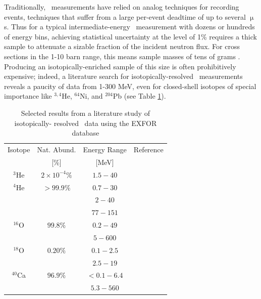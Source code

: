 \begin{eqation}
Traditionally, \tot\ measurements have relied on analog techniques for recording
events, techniques that suffer from a large per-event deadtime of
up to several $\upmu$s. Thus for a typical intermediate-energy \tot\ measurement
with dozens or hundreds of energy bins, achieving statistical uncertainty at the
level of 1\% requires a thick sample to attenuate a sizable fraction of the
incident neutron flux. For cross sections in the 1-10 barn range, this means
sample masses of tens of grams \cite{Finlay1993, Abfalterer2001}.
Producing an isotopically-enriched sample of this size is often
prohibitively expensive; indeed, a literature search for isotopically-resolved
\tot\ measurements reveals a paucity of data from 1-300 MeV, even for
closed-shell isotopes of special importance like $^{3,4}$He, $^{64}$Ni, and
$^{204}$Pb (see Table \ref{IsotopicCrossSectionTable}).

\begin{table}[ht]
    \caption{Selected results from a literature study of isotopically-
        resolved \tot\ data using the EXFOR database \cite{EXFORDatabase}}
    \label{IsotopicCrossSectionTable}
    \begin{center}
        \begin{tabular}{ c c c c }
            \hline
            Isotope & Nat. Abund. & Energy Range & Reference\\
                    & [\%] & [MeV] & \\

            \hline

            $^{3}$He & $2\times 10^{-4}\%$ & $1.5 - 40$ & \cite{Haesner1983}\\
            $^{4}$He & $>99.9\%$ & $0.7-30$ & \cite{Goulding1973}\\
            & & $2-40$ & \cite{Haesner1983}\\
            & & $77-151$ & \cite{Measday1966}\\

            $^{16}$O & $99.8\%$ & $0.2-49$ & \cite{Perey1972}\\
            & & $5-600$ & \cite{Finlay1993}\\

            $^{18}$O & $0.20\%$ & $0.1-2.5$ & \cite{Vaughn1965}\\
            & & $2.5-19$ & \cite{Salisbury1965}\\

            $^{40}$Ca & $96.9\%$ & $<0.1-6.4$ & \cite{Johnson1973}\\
            & & $5.3-560$ & \cite{Abfalterer2001}\\


\end{tabular}
\end{center}
\end{table}
\end{eqation}
